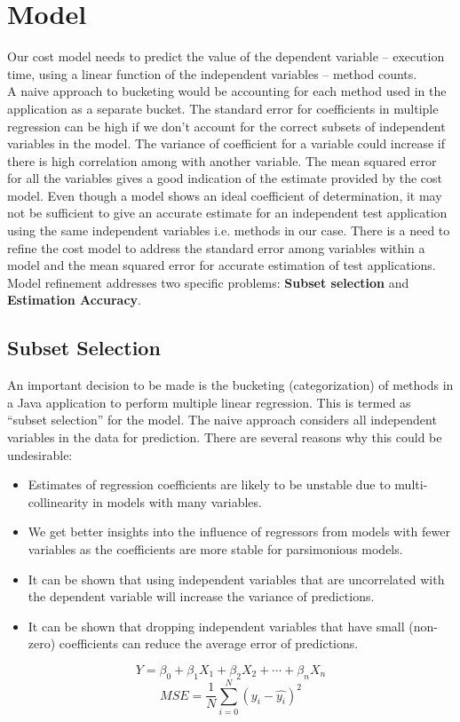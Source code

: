\chapter{Model}
\label{model}
Our cost model needs to predict the value of the dependent variable -- execution time, using a linear function of the independent variables -- method counts. \\

A naive approach to bucketing would be accounting for each method used in the application as a separate bucket. The standard error for coefficients in multiple regression can be high if we don't account for the correct subsets of independent variables in the model. The variance of coefficient for a variable could increase if there is high correlation among with another variable. The mean squared error for all the variables gives a good indication of the estimate provided by the cost model. Even though a model shows an ideal coefficient of determination, it may not be sufficient to give an accurate estimate for an independent test application using the same independent variables i.e. methods in our case. There is a need to refine the cost model to address the standard error among variables within a model and the mean squared error for accurate estimation of test applications.\\

Model refinement addresses two specific problems: \textbf{Subset selection} and \textbf{Estimation Accuracy}.

\section{Subset Selection}
An important decision to be made is the bucketing (categorization) of methods in a Java application to perform multiple linear regression. This is termed as ``subset selection'' for the model. The naive approach considers all independent variables in the data for prediction. There are several reasons why this could be undesirable:
\begin{itemize}
\item Estimates of regression coefficients are likely to be unstable due to multi-collinearity in models with many variables. 
\item We get better insights into the influence of regressors from models with fewer variables as the coefficients are more stable for parsimonious models.
\item It can be shown that using independent variables that are uncorrelated with the dependent variable will increase the variance of predictions.
\item It can be shown that dropping independent variables that have small (non-zero) coefficients can reduce the average error of predictions.
\end{itemize}

\begin{equation}
Y = \beta_{0} + \beta_{1}X_{1}+ \beta_{2}X_{2} + \dotsb+ \beta_{n}X_{n}
\end{equation}
\vspace{0.5em}
\begin{equation}
MSE = \frac{1}{N} \sum_{i=0}^{N} (y_{i} - \hat{y_{i}})^{2}
\end{equation}